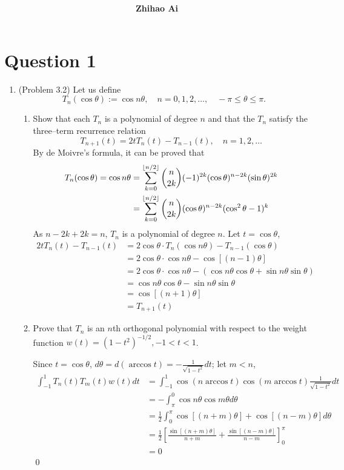 \documentclass[10pt]{report}
\title{
	\vspace{2in}
	\textmd{\textbf{\hwCourse\\\hwTitle}}\\
	\vspace{0.3in}\large{\textit{\hmwkClassInstructor}}
	\vspace{3in}
}
\author{\textbf{Zhihao Ai}}
\date{}
\newcommand{\dintt}[4] {\int_{#1}^{#2} #3 d#4}
\DeclarePairedDelimiter{\floor}{\lfloor}{\rfloor}
\begin{document}
\maketitle

\section*{Question 1}
\begin{enumerate}
	\item 
	(Problem 3.2) Let us define
	\[
	T_n(\cos{\theta}) := \cos{n\theta},\quad n = 0,1,2,\dots, \quad -\pi\le \theta\le \pi.
	\]
	\begin{enumerate}
		\item 
		Show that each $T_n$ is a polynomial of degree $n$ and that the $T_n$ satisfy the three–term recurrence relation
		\[
		T_{n+1}(t) = 2tT_n(t) - T_{n-1}(t),\quad n=1,2,\dots
		\]
		By de Moivre's formula, it can be proved that
		\begin{align*}
			T_n(\cos{\theta}) = \cos{n\theta}
			&= \sum_{k=0}^{\floor{n/2}} \binom{n}{2k} (-1)^{2k} (\cos\theta)^{n-2k} (\sin\theta)^{2k}\\
			&= \sum_{k=0}^{\floor{n/2}} \binom{n}{2k} (\cos\theta)^{n-2k} (\cos^2\theta - 1)^{k}
		\end{align*}
		As $n-2k + 2k = n$, $T_n$ is a polynomial of degree $n$. Let $t=\cos\theta$,
		\begin{align*}
			2tT_n(t) - T_{n-1}(t) 
			&= 2\cos\theta \cdot T_n(\cos{n\theta}) - T_{n-1}(\cos\theta)\\
			&= 2\cos\theta \cdot \cos{n\theta} - \cos{[(n-1)\theta]}\\
			&= 2\cos\theta \cdot \cos{n\theta} - (\cos{n\theta}\cos\theta + \sin{n\theta}\sin\theta)\\
			&= \cos{n\theta}\cos\theta - \sin{n\theta}\sin\theta\\
			&= \cos{[(n+1)\theta]}\\
			&= T_{n+1}(t)
		\end{align*}
		
		\item 
		Prove that $T_n$ is an $n$th orthogonal polynomial with respect to the weight function $w(t)=(1-t^2)^{-1/2}, -1<t<1$.
		
		Since $t=\cos\theta$, $d\theta = d(\arccos{t}) = -\frac{1}{\sqrt{1-t^2}}dt$; let $m<n$,
		\begin{align*}
			\dintt{-1}{1}{T_n(t) T_m(t) w(t)}{t}
			&= \dintt{-1}{1}{\cos(n\arccos{t}) \cos(m\arccos{t}) \frac{1}{\sqrt{1-t^2}}}{t}\\
			&= -\dintt{\pi}{0}{\cos{n\theta} \cos{m\theta}}{\theta}\\
			&= \frac{1}{2}\dintt{0}{\pi}{ \cos[(n+m)\theta] + \cos[(n-m)\theta]}{\theta}\\
			&= \frac{1}{2} \left[\frac{\sin[(n+m)\theta]}{n+m} + \frac{\sin[(n-m)\theta]}{n-m} \right]_0^\pi\\
			&= 0
		\end{align*}
		\qed
		

\end{enumerate}
\end{enumerate}
\end{document}
